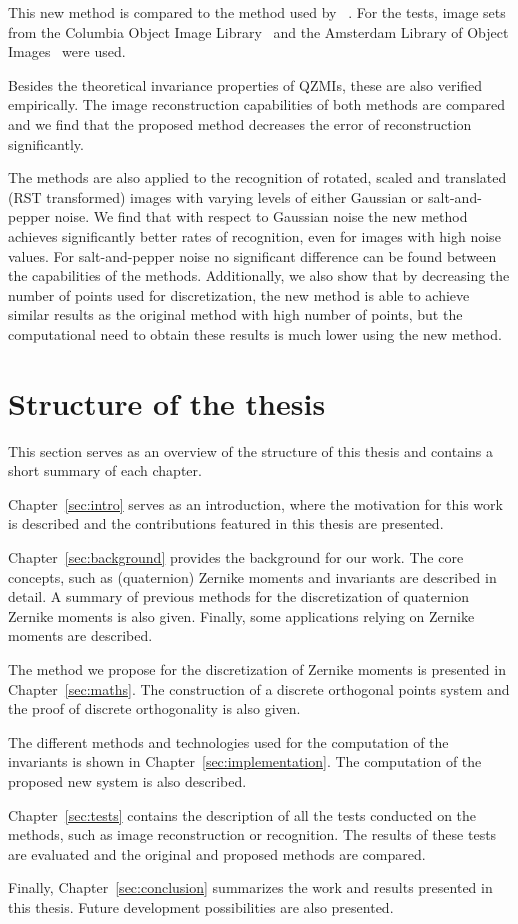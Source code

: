 This new method is compared to the method used by \citeauthor{qzmi}~\cite{qzmi}. For the tests, image sets from the Columbia Object Image Library~\cite{coil} and the Amsterdam Library of Object Images~\cite{aloi} were used. 

Besides the theoretical invariance properties of QZMIs, these are also verified empirically. The image reconstruction capabilities of both methods are compared and we find that the proposed method decreases the error of reconstruction significantly.

The methods are also applied to the recognition of rotated, scaled and translated (RST transformed) images with varying levels of either Gaussian or salt-and-pepper noise. We find that with respect to Gaussian noise the new method achieves significantly better rates of recognition, even for images with high noise values. For salt-and-pepper noise no significant difference can be found between the capabilities of the methods.
Additionally, we also show that by decreasing the number of points used for discretization, the new method is able to achieve similar results as the original method with high number of points, but the computational need to obtain these results is much lower using the new method.


\section{Structure of the thesis}
This section serves as an overview of the structure of this thesis and contains a short summary of each chapter.

Chapter~\ref{sec:intro} serves as an introduction, where the motivation for this work is described and the contributions featured in this thesis are presented.

Chapter~\ref{sec:background} provides the background for our work. The core concepts, such as (quaternion) Zernike moments and invariants are described in detail. A summary of previous methods for the discretization of quaternion Zernike moments is also given. Finally, some applications relying on Zernike moments are described.

The method we propose for the discretization of Zernike moments is presented in Chapter~\ref{sec:maths}. The construction of a discrete orthogonal points system and the proof of discrete orthogonality is also given.

The different methods and technologies used for the computation of the invariants is shown in Chapter~\ref{sec:implementation}. The computation of the proposed new system is also described.

Chapter~\ref{sec:tests} contains the description of all the tests conducted on the methods, such as image reconstruction or recognition. The results of these tests are evaluated and the original and proposed methods are compared.

Finally, Chapter~\ref{sec:conclusion} summarizes the work and results presented in this thesis. Future development possibilities are also presented.